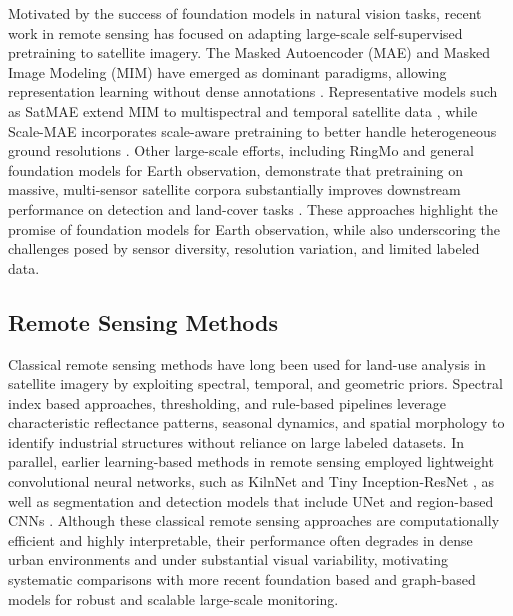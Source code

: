 \documentclass{article}
\theoremstyle{plain}
\theoremstyle{definition}
\theoremstyle{remark}
\begin{document}
Motivated by the success of foundation models in natural vision tasks, recent work in remote sensing has focused on adapting large-scale self-supervised pretraining to satellite imagery. The Masked Autoencoder (MAE) and Masked Image Modeling (MIM) have emerged as dominant paradigms, allowing representation learning without dense annotations \cite{he2022masked}. Representative models such as SatMAE extend MIM to multispectral and temporal satellite data \cite{cong2022satmae}, while Scale-MAE incorporates scale-aware pretraining to better handle heterogeneous ground resolutions \cite{reed2023scalemae}. Other large-scale efforts, including RingMo and general foundation models for Earth observation, demonstrate that pretraining on massive, multi-sensor satellite corpora substantially improves downstream performance on detection and land-cover tasks \cite{sun2022ringmo, zhang2024geoscience}. These approaches highlight the promise of foundation models for Earth observation, while also underscoring the challenges posed by sensor diversity, resolution variation, and limited labeled data.

\subsection{Remote Sensing Methods}
Classical remote sensing methods have long been used for land-use analysis in satellite imagery by exploiting spectral, temporal, and geometric priors. Spectral index based approaches, thresholding, and rule-based pipelines leverage characteristic reflectance patterns, seasonal dynamics, and spatial morphology to identify industrial structures without reliance on large labeled datasets. In parallel, earlier learning-based methods in remote sensing employed lightweight convolutional neural networks, such as KilnNet \cite{nazir2020kiln} and Tiny Inception-ResNet \cite{nazir2019tiny}, as well as segmentation and detection models that include UNet \cite{ronneberger2015u} and region-based CNNs \cite{ren2016faster, girshick2015fast}. Although these classical remote sensing approaches are computationally efficient and highly interpretable, their performance often degrades in dense urban environments and under substantial visual variability, motivating systematic comparisons with more recent foundation based and graph-based models for robust and scalable large-scale monitoring.



\end{document}
